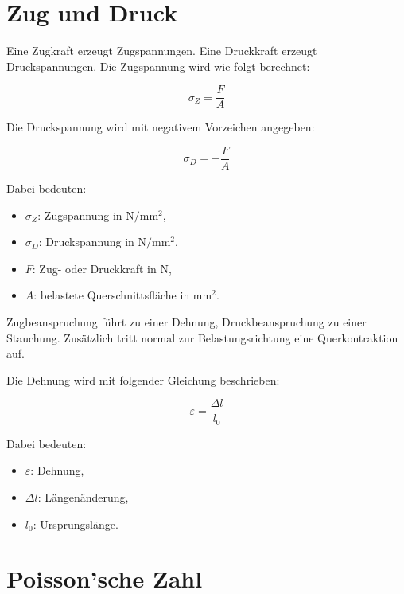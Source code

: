 \documentclass[
  12pt,
  a4paper,
  oneside
]{scrreprt}
\begin{document}
\section{Zug und Druck}

Eine Zugkraft erzeugt Zugspannungen. Eine Druckkraft erzeugt
Druckspannungen. Die Zugspannung wird wie folgt berechnet:

\begin{equation}
  \sigma_Z = \frac{F}{A}
\end{equation}

Die Druckspannung wird mit negativem Vorzeichen angegeben:

\begin{equation}
  \sigma_D = -\frac{F}{A}
\end{equation}

Dabei bedeuten:

\begin{itemize}
  \item $\sigma_Z$: Zugspannung in $\mathrm{N/mm^2}$,
  \item $\sigma_D$: Druckspannung in $\mathrm{N/mm^2}$,
  \item $F$: Zug- oder Druckkraft in $\mathrm{N}$,
  \item $A$: belastete Querschnittsfläche in $\mathrm{mm^2}$.
\end{itemize}



Zugbeanspruchung führt zu einer Dehnung, Druckbeanspruchung zu einer
Stauchung. Zusätzlich tritt normal zur Belastungsrichtung eine
Querkontraktion auf. 

Die Dehnung wird mit folgender Gleichung beschrieben:

\begin{equation}
  \varepsilon = \frac{\Delta l}{l_0}
\end{equation}

Dabei bedeuten:

\begin{itemize}
  \item $\varepsilon$: Dehnung,
  \item $\Delta l$: Längenänderung,
  \item $l_0$: Ursprungslänge.
\end{itemize}



\section{Poisson'sche Zahl}
\end{document}
